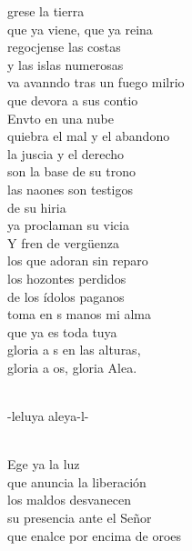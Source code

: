 \begin{cancion}%
	grese la tierra  \\
que ya viene, que ya reina\\
	regocjense las costas \\
y las islas numerosas\\
	va avanndo tras un fuego milrio\\
	que devora a sus contio\\
\jump
	Envto en una nube \\
quiebra el mal y el abandono\\
	la juscia y el derecho \\
son la base de su trono\\
	las naones son testigos \\
	de su hiria\\
	ya proclaman su vicia\\
\jump
	Y fren de vergüenza \\
los que adoran sin reparo\\
	los hozontes perdidos \\
de los ídolos paganos\\
	toma en s manos mi alma \\
	que ya es toda tuya\\
	gloria a s en las alturas, \\
	gloria a os, gloria Alea.\\\jump\\
	\begin{chorus}%
	-leluya aleya-l-\\
	\end{chorus}%
	\jump\\
	Ege ya la luz \\
que anuncia la liberación\\
	los maldos desvanecen \\
su presencia ante el Señor\\
	que enalce por encima de oroes\\

\end{cancion}
